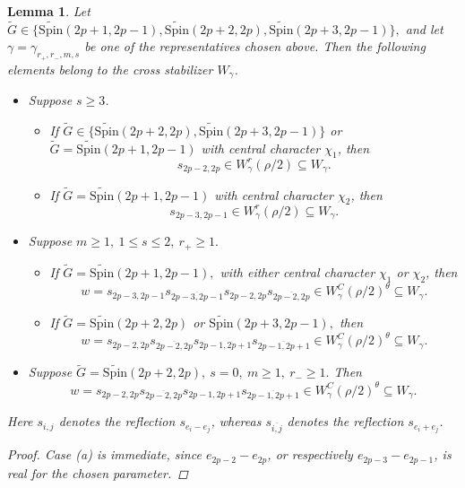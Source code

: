 \documentclass{amsart}
\newcommand{\Spin}{{\mathrm{Spin}}}
\newtheorem{lemma}[thm]{Lemma}
\theoremstyle{definition}
\begin{document}
\begin{lemma}\label{l:x-stab}
Let $\widetilde G\in
\{
\widetilde{\Spin}(2p+1,2p-1),
\widetilde{\Spin}(2p+2,2p),
\widetilde{\Spin}(2p+3,2p-1)
\},$ and let
\(\gamma=\gamma_{r_+,r_-,m,s}\)
be one of the representatives chosen above. Then the following
elements belong to the cross stabilizer \(W_\gamma\).

\begin{itemize}

\item[(a)] Suppose \(s\geq3\).
\begin{itemize}
    \item[(i)] If
    $\widetilde G\in\{
\widetilde{\Spin}(2p+2,2p),
\widetilde{\Spin}(2p+3,2p-1)\}$ or 
$\widetilde G=\widetilde{\Spin}(2p+1,2p-1)$ with central character $\chi_1$,
then $$s_{2p-2,2p}
\in
W_\gamma^r(\rho/2)
\subseteq W_\gamma.$$
\item[(ii)] If
$\widetilde G=\widetilde{\Spin}(2p+1,2p-1)$ with central character $\chi_2$,
then
$$s_{2p-3,2p-1}
\in
W_\gamma^r(\rho/2)
\subseteq W_\gamma.$$
\end{itemize}
\item[(b)] Suppose
$m\geq1,\  1\leq s\leq2,\ r_+\geq1.$
\begin{itemize}
    \item[(i)] If
$\widetilde G=\widetilde{\Spin}(2p+1,2p-1),$
with either central character \(\chi_1\) or \(\chi_2\), then
\[
w=
s_{2p-3,2p-1}s_{\overline{2p-3,2p-1}}
s_{2p-2,2p}s_{\overline{2p-2,2p}}
\in
W_\gamma^C(\rho/2)^\theta
\subseteq W_\gamma.
\]

\item[(ii)] If
$\widetilde G=
\widetilde{\Spin}(2p+2,2p)
$ or  $\widetilde{\Spin}(2p+3,2p-1),$
then
\[
w=
s_{2p-2,2p}s_{\overline{2p-2,2p}}
s_{2p-1,2p+1}s_{\overline{2p-1,2p+1}}
\in
W_\gamma^C(\rho/2)^\theta
\subseteq W_\gamma.
\]
\end{itemize}
\item[(c)] Suppose
$\widetilde G=\widetilde{\Spin}(2p+2,2p),
\  s=0,\  m\geq1,\ 
r_-\geq1.$
Then
\[
w=
s_{2p-2,2p}s_{\overline{2p-2,2p}}
s_{2p-1,2p+1}s_{\overline{2p-1,2p+1}}
\in
W_\gamma^C(\rho/2)^\theta
\subseteq W_\gamma.
\]

\end{itemize}

Here \(s_{i,j}\) denotes the reflection
\(s_{e_i-e_j}\), whereas
\(s_{\overline{i,j}}\) denotes the reflection
\(s_{e_i+e_j}\).

\begin{proof}
Case (a) is immediate, since
\(e_{2p-2}-e_{2p}\), or respectively
\(e_{2p-3}-e_{2p-1}\), is real for the chosen parameter.


\end{proof}
\end{lemma}
\end{document}
